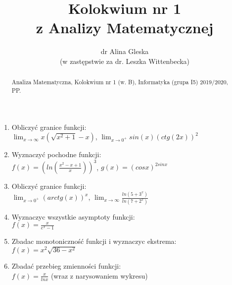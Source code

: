 \documentclass[a5paper,12pt]{article}
\title{Kolokwium nr 1 \\z Analizy Matematycznej}
\author{dr Alina Gleska \\(w zastępstwie za dr. Leszka Wittenbecka)}
\begin{document}
\maketitle

\begin{abstract}
Analiza Matematyczna, Kolokwium nr 1 (w. B), Informatyka (grupa I5) 2019/2020, PP.
\end{abstract}
\begin{enumerate}
 \item Obliczyć granice funkcji: \\
    $\lim_{x\rightarrow \infty}x(\sqrt{x^2+1}-x)$, 
    $\lim_{x\rightarrow 0^+}sin(x)(ctg(2x))^2$
 \item Wyznaczyć pochodne funkcji: \\
    $f(x)=(ln(\frac{x^2-x+1}{x}))^3$, $g(x)=(cosx)^{2sinx} $
 \item Obliczyć granice funkcji: \\
 $\lim_{x \rightarrow 0^+}(arctg(x))^x$, $\lim_{x\rightarrow \infty}\frac{ln(5+3^x)}{ln(7+2^x)}$
 \item Wyznaczyc wszystkie asymptoty funkcji: \\
 $f(x)=\frac{x}{e^x-1}$
 \item Zbadac monotoniczność funkcji i wyznaczyc ekstrema: \\
 $f(x)=x^2\sqrt{36-x^2}$
 \item Zbadać przebieg zmienności funkcji: \\
 $f(x)=\frac{x}{lnx}$ (wraz z narysowaniem wykresu)
\end{enumerate}
\end{document}
